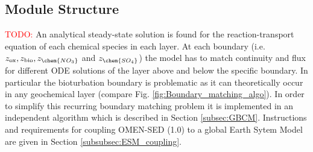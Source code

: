 \documentclass[gmd, manuscript]{copernicus}
\begin{document}
\subsection{Module Structure}\label{subsec:module_Structure}
\textcolor{red}{TODO: }
An analytical steady-state solution is found for the reaction-transport equation of each chemical species in each layer. 
At each boundary (i.e. $z_{\mathrm{ox}}, z_{\mathrm{bio}}, z_{\chem{NO_3}}$ and $z_{\chem{SO_4}}$) the model has to match continuity and flux for different ODE solutions of the layer above and below the specific boundary. 
In particular the bioturbation boundary is problematic as it can theoretically occur in any geochemical layer (compare Fig. \ref{fig:Boundary_matching_algo}). In order to simplify this recurring boundary matching problem it is implemented in an independent algorithm 
which is described in Section \ref{subsec:GBCM}. Instructions and requirements for coupling OMEN-SED (1.0) to a global Earth Sytem Model are given in Section \ref{subsubsec:ESM_coupling}.
\end{document}
